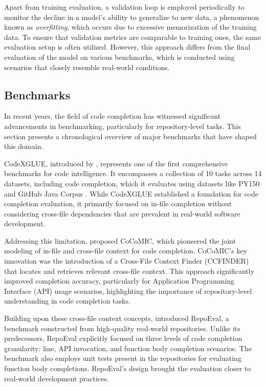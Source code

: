 Apart from training evaluation, a validation loop is employed periodically to monitor the decline in a model's ability to generalize to new data, a phenomenon known as \textit{overfitting}, which occurs due to excessive memorization of the training data. To ensure that validation metrics are comparable to training ones, the same evaluation setup is often utilized. However, this approach differs from the final evaluation of the model on various benchmarks, which is conducted using scenarios that closely resemble real-world conditions.

\subsection{Benchmarks}\label{sec:benchmarks}

In recent years, the field of code completion has witnessed significant advancements in benchmarking, particularly for repository-level tasks. This section presents a chronological overview of major benchmarks that have shaped this domain.

CodeXGLUE, introduced by \citet{lu2021}, represents one of the first comprehensive benchmarks for code intelligence. It encompasses a collection of 10 tasks across 14 datasets, including code completion, which it evaluates using datasets like PY150 \parencite{raychev2016} and GitHub Java Corpus \parencite{allamanis2013}. While CodeXGLUE established a foundation for code completion evaluation, it primarily focused on in-file completion without considering cross-file dependencies that are prevalent in real-world software development.

Addressing this limitation, \citet{ding2022} proposed CoCoMIC, which pioneered the joint modeling of in-file and cross-file context for code completion. CoCoMIC's key innovation was the introduction of a Cross-File Context Finder (CCFINDER) that locates and retrieves relevant cross-file context. This approach significantly improved completion accuracy, particularly for Application Programming Interface (API) usage scenarios, highlighting the importance of repository-level understanding in code completion tasks.

Building upon these cross-file context concepts, \citet{zhang2023a} introduced RepoEval, a benchmark constructed from high-quality real-world repositories. Unlike its predecessors, RepoEval explicitly focused on three levels of code completion granularity: line, API invocation, and function body completion scenarios. The benchmark also employs unit tests present in the repositories for evaluating function body completions. RepoEval's design brought the evaluation closer to real-world development practices.


